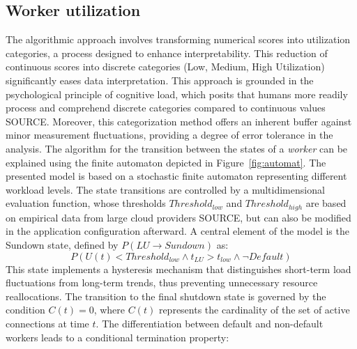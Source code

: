 \documentclass[twocolumn]{webofc}
\begin{document}
\subsection{Worker utilization}
The algorithmic approach involves transforming numerical scores into utilization categories, a process designed to enhance interpretability. This reduction of continuous scores into discrete categories (Low, Medium, High Utilization) significantly eases data interpretation. This approach is grounded in the psychological principle of cognitive load, which posits that humans more readily process and comprehend discrete categories compared to continuous values {\color{red} SOURCE}. Moreover, this categorization method offers an inherent buffer against minor measurement fluctuations, providing a degree of error tolerance in the analysis. The algorithm for the transition between the states of a \textit{worker} can be explained using the finite automaton depicted in Figure~\ref{fig:automat}. The presented model is based on a stochastic finite automaton representing different workload levels. The state transitions are controlled by a multidimensional evaluation function, whose thresholds $Threshold_{low}$ and $Threshold_{high}$ are based on empirical data from large cloud providers {\color{red} SOURCE}, but can also be modified in the application configuration afterward. A central element of the model is the Sundown state, defined by \( P(LU \rightarrow Sundown) \) as:
$$P(U(t) < Threshold_{low} \wedge t_{LU} > t_{low} \wedge \neg Default) $$
This state implements a hysteresis mechanism that distinguishes short-term load fluctuations from long-term trends, thus preventing unnecessary resource reallocations. The transition to the final shutdown state is governed by the condition $C(t) = 0$, where $C(t)$ represents the cardinality of the set of active connections at time $t$. The differentiation between default and non-default workers leads to a conditional termination property:
\end{document}
